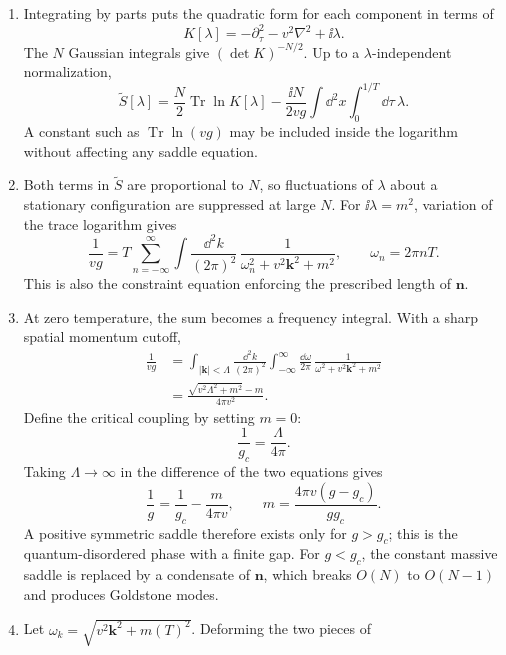 \begin{enumerate}
  \begin{enumerate}
    \item[(a)]
    Integrating by parts puts the quadratic form for each component in terms
    of
    \[
      K[\lambda]=-\partial_\tau^2-v^2\nabla^2+\ii\lambda.
    \]
    The \(N\) Gaussian integrals give \((\det K)^{-N/2}\).  Up to a
    \(\lambda\)-independent normalization,
    \[
      \boxed{
      \widetilde S[\lambda]
        =\frac N2\operatorname{Tr}\ln K[\lambda]
         -\frac{\ii N}{2vg}\int \dd^2x\int_0^{1/T}\dd\tau\,\lambda.}
    \]
    A constant such as \(\operatorname{Tr}\ln(vg)\) may be included inside
    the logarithm without affecting any saddle equation.
    \item[(b)]
    Both terms in \(\widetilde S\) are proportional to \(N\), so fluctuations
    of \(\lambda\) about a stationary configuration are suppressed at large
    \(N\).  For \(\ii\lambda=m^2\), variation of the trace logarithm gives
    \[
      \boxed{
      \frac1{vg}
        =T\sum_{n=-\infty}^{\infty}
          \int\frac{\dd^2k}{(2\pi)^2}\,
          \frac1{\omega_n^2+v^2\mathbf k^2+m^2},
      \qquad \omega_n=2\pi nT.}
    \]
    This is also the constraint equation enforcing the prescribed length of
    \(\mathbf n\).
    \item[(c)]
    At zero temperature, the sum becomes a frequency integral.  With a sharp
    spatial momentum cutoff,
    \[
      \begin{split}
      \frac1{vg}
        &=\int_{|\mathbf k|<\Lambda}\frac{\dd^2k}{(2\pi)^2}
          \int_{-\infty}^{\infty}\frac{\dd\omega}{2\pi}\,
          \frac1{\omega^2+v^2\mathbf k^2+m^2}\\
        &=\frac{\sqrt{v^2\Lambda^2+m^2}-m}{4\pi v^2}.
      \end{split}
    \]
    Define the critical coupling by setting \(m=0\):
    \[
      \frac1{g_c}=\frac\Lambda{4\pi}.
    \]
    Taking \(\Lambda\to\infty\) in the difference of the two equations gives
    \[
      \frac1g=\frac1{g_c}-\frac{m}{4\pi v},
      \qquad
      \boxed{m=\frac{4\pi v(g-g_c)}{gg_c}.}
    \]
    A positive symmetric saddle therefore exists only for \(g>g_c\); this is
    the quantum-disordered phase with a finite gap.  For \(g<g_c\), the
    constant massive saddle is replaced by a condensate of \(\mathbf n\),
    which breaks \(O(N)\) to \(O(N-1)\) and produces Goldstone modes.
    \item[(d)]
    Let \(\omega_k=\sqrt{v^2\mathbf k^2+m(T)^2}\).  Deforming the two pieces of

\end{enumerate}
\end{enumerate}
